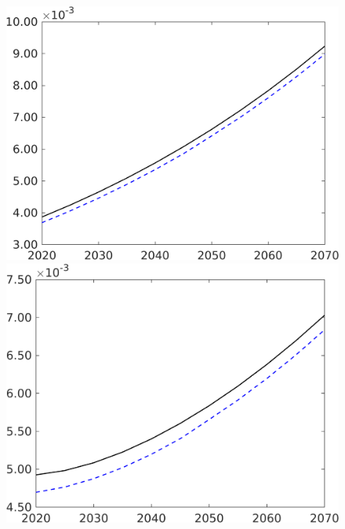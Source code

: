 \begin{figure}[h!!]
\begin{minipage}[]{0.32\textwidth}
\end{minipage}
\begin{minipage}[]{0.32\textwidth}
	\includegraphics[width=1\textwidth]{../../codding_model/own_basedOnFried/optimalPol_190722_tidiedUp/figures/all_10Aout22/CountTaul_modtest_target_wsf_spillover0_sep1_extern0_PV1_etaa0.79_lgd0.png}
\end{minipage}
\begin{minipage}[]{0.32\textwidth}
	\includegraphics[width=1\textwidth]{../../codding_model/own_basedOnFried/optimalPol_190722_tidiedUp/figures/all_10Aout22/CountTaul_modtest_target_wsg_spillover0_sep1_extern0_PV1_etaa0.79_lgd0.png}

\end{minipage}
\end{figure}
